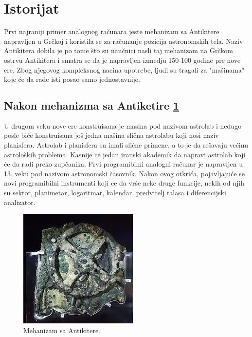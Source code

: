 \documentclass[a4paper]{article}
\begin{document}
{\section{Istorijat}
\label{sec:naslovN}

Prvi najraniji primer analognog računara jeste mehanizam sa Antikitere napravljen u Grčkoj i koristila se za računanje pozicija astronomskih tela. Naziv Antikitera dobila je po tome što su naučnici nasli taj mehanizam na Grčkom ostrvu Antikitera i smatra se da je napravljen izmedju 150-100 godine pre nove ere. Zbog njegovog kompleksnog nacina upotrebe, ljudi su tragali za "mašinama" koje će da rade isti posao samo jednostavnije. 

\subsection{Nakon mehanizma sa Antiketire \ref{fig:h2}}
\label{subsec:podnaslovK}

U drugom veku nove ere konstruisana je masina pod nazivom astrolab i nedugo posle biće konstruisana još jedna mašina slična astrolabu koji nosi naziv planisfera. Astrolab i planisfera su imali slične primene, a to je da rešavaju većinu astroloških problema. Kasnije ce jedan iranski akademik da napravi astrolab koji će da radi preko zupčanika. Prvi programibilni analogni računar je napravljen u 13. veku pod nazivom astronomski časovnik. Nakon ovog otkrića, pojavljajuće se novi programibilni instrumenti koji ce da vrše neke druge funkcije, nekih od njih su sektor, planimetar, logaritmar, kalendar, predvitelj talasa i diferencijski analizator.

\begin{figure}[h!]
\begin{center}
\includegraphics[scale=1]{MehanizamSaAntiketere.jpg}
\end{center}
\caption{Mehanizam sa Antikitere. }
\label{fig:h2}
\end{figure}

}
\end{document}

